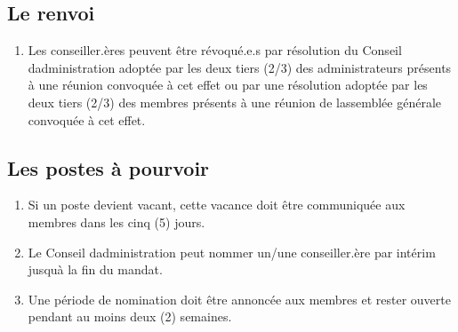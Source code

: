 \subsection{Le renvoi}
\label{le-renvoi-2}

\begin{enumerate}
 \item
  Les conseiller.ères peuvent être révoqué.e.s par résolution du Conseil d\textquotesingle administration adoptée par les deux tiers (2/3) des administrateurs présents à une réunion convoquée à cet effet ou par une résolution adoptée par les deux tiers (2/3) des membres présents à une réunion de l\textquotesingle assemblée générale convoquée à cet effet.
\end{enumerate}

\subsection{Les postes à pourvoir}
\label{les-postes-a-pourvoir-4}

\begin{enumerate}
 \item
  Si un poste devient vacant, cette vacance doit être communiquée aux membres dans les cinq (5) jours.
 \item
  Le Conseil d\textquotesingle administration peut nommer un/une conseiller.ère par intérim jusqu\textquotesingle à la fin du mandat.
 \item
  Une période de nomination doit être annoncée aux membres et rester ouverte pendant au moins deux (2) semaines.
\end{enumerate}

